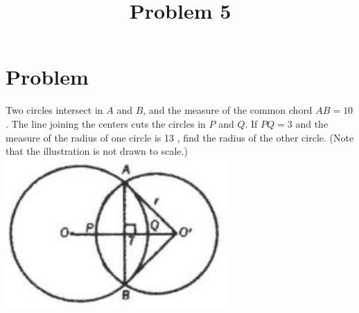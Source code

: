 \documentclass{article}
\title{Problem 5}
\date{}
\begin{document}
\maketitle

\section*{Problem}
Two circles intersect in \(A\) and \(B\), and the measure of the common chord \(A B=10\). The line joining the centers cuts the circles in \(P\) and \(Q\). If \(P Q=3\) and the measure of the radius of one circle is 13 , find the radius of the other circle. (Note that the illustration is not drawn to scale.)\\
\centering
\includegraphics[width=\textwidth]{images/problem_image_1.jpg}
\end{document}
